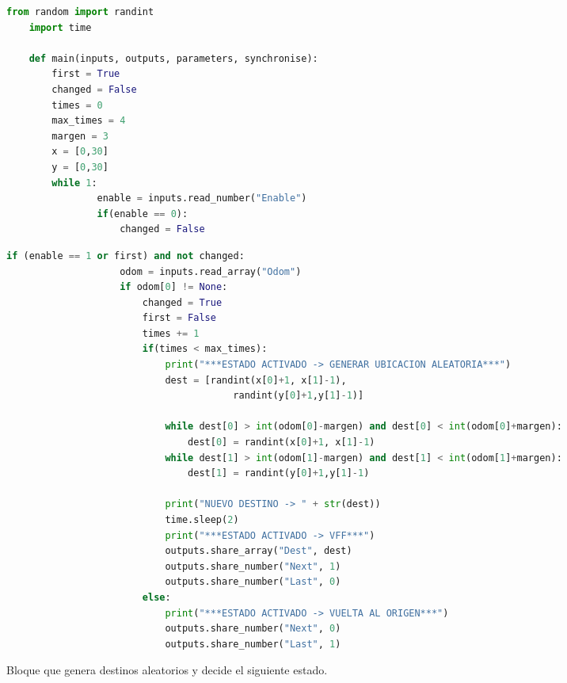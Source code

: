 \begin{code}[H]
    \begin{lstlisting}[language=python]
    from random import randint
    import time

    def main(inputs, outputs, parameters, synchronise):
        first = True
        changed = False
        times = 0
        max_times = 4
        margen = 3
        x = [0,30]
        y = [0,30]
        while 1:    
                enable = inputs.read_number("Enable")
                if(enable == 0):
                    changed = False
    \end{lstlisting}
\end{code}
\begin{code}[H]
    \begin{lstlisting}[language=python]
                if (enable == 1 or first) and not changed:
                    odom = inputs.read_array("Odom")
                    if odom[0] != None:
                        changed = True
                        first = False
                        times += 1
                        if(times < max_times):
                            print("***ESTADO ACTIVADO -> GENERAR UBICACION ALEATORIA***")
                            dest = [randint(x[0]+1, x[1]-1),
                                        randint(y[0]+1,y[1]-1)]

                            while dest[0] > int(odom[0]-margen) and dest[0] < int(odom[0]+margen):
                                dest[0] = randint(x[0]+1, x[1]-1)
                            while dest[1] > int(odom[1]-margen) and dest[1] < int(odom[1]+margen):
                                dest[1] = randint(y[0]+1,y[1]-1)
                                
                            print("NUEVO DESTINO -> " + str(dest))
                            time.sleep(2)
                            print("***ESTADO ACTIVADO -> VFF***")
                            outputs.share_array("Dest", dest)
                            outputs.share_number("Next", 1)
                            outputs.share_number("Last", 0)
                        else:
                            print("***ESTADO ACTIVADO -> VUELTA AL ORIGEN***")
                            outputs.share_number("Next", 0)
                            outputs.share_number("Last", 1)
    \end{lstlisting}
    \caption[Bloque generador aleatorio de destinos]{Bloque que genera destinos aleatorios y decide el siguiente estado.}
    \label{cod:FSM_asker}
\end{code}

